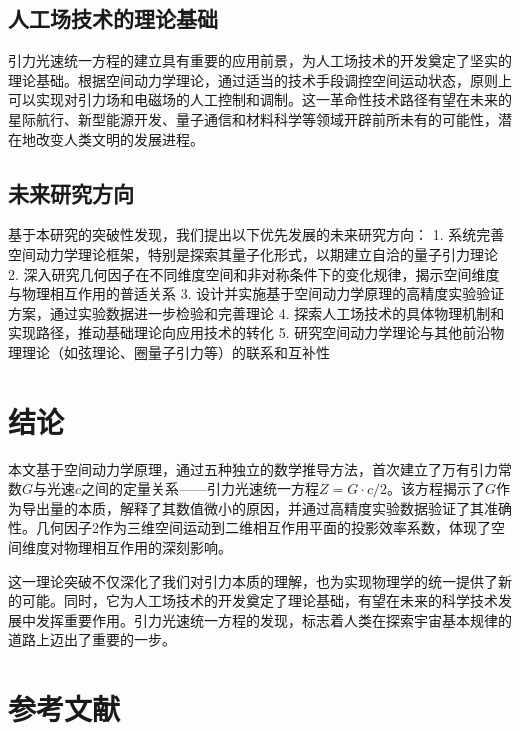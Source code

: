 \documentclass[12pt,twocolumn]{ctexart}
\begin{document}
\subsection{人工场技术的理论基础}

引力光速统一方程的建立具有重要的应用前景，为人工场技术的开发奠定了坚实的理论基础。根据空间动力学理论，通过适当的技术手段调控空间运动状态，原则上可以实现对引力场和电磁场的人工控制和调制。这一革命性技术路径有望在未来的星际航行、新型能源开发、量子通信和材料科学等领域开辟前所未有的可能性，潜在地改变人类文明的发展进程。

\subsection{未来研究方向}

基于本研究的突破性发现，我们提出以下优先发展的未来研究方向：
1. 系统完善空间动力学理论框架，特别是探索其量子化形式，以期建立自洽的量子引力理论
2. 深入研究几何因子在不同维度空间和非对称条件下的变化规律，揭示空间维度与物理相互作用的普适关系
3. 设计并实施基于空间动力学原理的高精度实验验证方案，通过实验数据进一步检验和完善理论
4. 探索人工场技术的具体物理机制和实现路径，推动基础理论向应用技术的转化
5. 研究空间动力学理论与其他前沿物理理论（如弦理论、圈量子引力等）的联系和互补性

\section{结论}

本文基于空间动力学原理，通过五种独立的数学推导方法，首次建立了万有引力常数$G$与光速$c$之间的定量关系——引力光速统一方程$Z=G\cdot c/2$。该方程揭示了$G$作为导出量的本质，解释了其数值微小的原因，并通过高精度实验数据验证了其准确性。几何因子2作为三维空间运动到二维相互作用平面的投影效率系数，体现了空间维度对物理相互作用的深刻影响。

这一理论突破不仅深化了我们对引力本质的理解，也为实现物理学的统一提供了新的可能。同时，它为人工场技术的开发奠定了理论基础，有望在未来的科学技术发展中发挥重要作用。引力光速统一方程的发现，标志着人类在探索宇宙基本规律的道路上迈出了重要的一步。

\section{参考文献}
\end{document}

